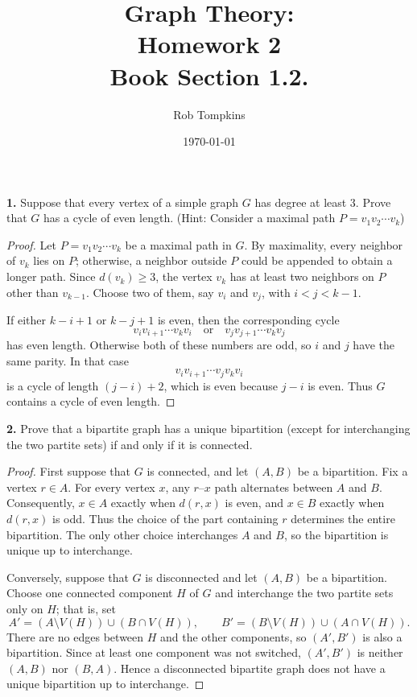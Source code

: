 \documentclass[12pt]{amsart}
\title{Graph Theory:\\Homework 2\\ Book Section 1.2.}
\author{Rob Tompkins}
\date{\today}
\theoremstyle{conjecture}
\theoremstyle{definition}
\theoremstyle{question}
\theoremstyle{theorem}
\begin{document}
    \maketitle
    \noindent\textbf{1.} Suppose that every vertex of a simple graph $G$ has degree at least 3.
    Prove that $G$ has a cycle of even length.
    (Hint: Consider a maximal path $P=v_1 v_2 \cdots v_k$)

    \begin{proof}
        Let $P=v_1v_2\cdots v_k$ be a maximal path in $G$.  By maximality,
        every neighbor of $v_k$ lies on $P$; otherwise, a neighbor outside $P$
        could be appended to obtain a longer path.  Since $d(v_k)\geq 3$, the
        vertex $v_k$ has at least two neighbors on $P$ other than $v_{k-1}$.
        Choose two of them, say $v_i$ and $v_j$, with $i<j<k-1$.

        If either $k-i+1$ or $k-j+1$ is even, then the corresponding cycle
        \[
            v_i v_{i+1}\cdots v_kv_i
            \quad\text{or}\quad
            v_j v_{j+1}\cdots v_kv_j
        \]
        has even length.  Otherwise both of these numbers are odd, so $i$ and
        $j$ have the same parity.  In that case
        \[
            v_i v_{i+1}\cdots v_jv_kv_i
        \]
        is a cycle of length $(j-i)+2$, which is even because $j-i$ is even.
        Thus $G$ contains a cycle of even length.
    \end{proof}

    \noindent\textbf{2.} Prove that a bipartite graph has a unique bipartition
    (except for interchanging the two partite sets) if and only if it is connected.

    \begin{proof}
        First suppose that $G$ is connected, and let $(A,B)$ be a bipartition.
        Fix a vertex $r\in A$.  For every vertex $x$, any $r$--$x$ path
        alternates between $A$ and $B$.  Consequently, $x\in A$ exactly when
        $d(r,x)$ is even, and $x\in B$ exactly when $d(r,x)$ is odd.  Thus the
        choice of the part containing $r$ determines the entire bipartition.
        The only other choice interchanges $A$ and $B$, so the bipartition is
        unique up to interchange.

        Conversely, suppose that $G$ is disconnected and let $(A,B)$ be a
        bipartition.  Choose one connected component $H$ of $G$ and interchange
        the two partite sets only on $H$; that is, set
        \[
            A'=(A\setminus V(H))\cup(B\cap V(H)),\qquad
            B'=(B\setminus V(H))\cup(A\cap V(H)).
        \]
        There are no edges between $H$ and the other components, so $(A',B')$
        is also a bipartition.  Since at least one component was not switched,
        $(A',B')$ is neither $(A,B)$ nor $(B,A)$.  Hence a disconnected
        bipartite graph does not have a unique bipartition up to interchange.
    \end{proof}
\end{document}

